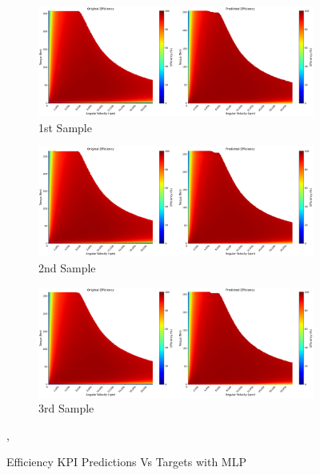 \documentclass{report} %
\begin{document}
\begin{figure}[H]
    \centering
    \begin{subfigure}{1\textwidth}
        \centering
        \includegraphics[width=1\textwidth]{./ReportImages/KPI3Dprediction1.png} 
        \caption{1st Sample} 
        \label{fig:1st Sample}
    \end{subfigure}\hfill
    \begin{subfigure}{1\textwidth}
        \centering
        \includegraphics[width=1\textwidth]{./ReportImages/KPI3Dprediction2.png} 
        \caption{2nd Sample} 
        \label{fig:2nd Sample}
    \end{subfigure}\hfill
    \begin{subfigure}{1\textwidth}
        \centering
        \includegraphics[width=1\textwidth]{./ReportImages/KPI3Dprediction3.png} 
        \caption{3rd Sample} 
        \label{fig:3rd Sample}
    \end{subfigure}
    \caption{Efficiency \ac{KPI} Predictions Vs Targets with \ac{MLP}},
    \label{fig:Efficiency KPI Predictions Vs Targets with MLP}
\end{figure} 
\end{document}
